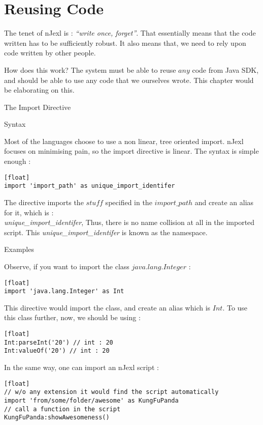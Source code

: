 \chapter{Reusing Code}\label{code-reuse}

{\LARGE T}he tenet of nJexl is : \emph{``write once, forget''}.
That essentially means that the code written has to be sufficiently robust.
It also means that, we need to rely upon code written by other people.

How does this work? The system must be able to reuse $any$ code 
from Java SDK, and should be able to use any code that we ourselves wrote.
This chapter would be elaborating on this.

\begin{section}{The Import Directive}

\begin{subsection}{Syntax}

Most of the languages choose to use a non linear, tree oriented import.
nJexl focuses on minimising pain, so the import directive is linear.
The syntax is simple enough :
\begin{lstlisting}[style=JexlStyle][float]
import 'import_path' as unique_import_identifer
\end{lstlisting}

The directive imports the $stuff$ specified in the $import\_path$ and create 
an alias for it, which is : \\ \emph{unique\_import\_identifer},
Thus, there is no name collision at all in the imported script.
This \emph{unique\_import\_identifer} is known as the namespace.

\end{subsection}

 
\begin{subsection}{Examples}

Observe, if you want to import the class $java.lang.Integer$ :

\begin{lstlisting}[style=JexlStyle][float]
import 'java.lang.Integer' as Int
\end{lstlisting}

This directive would import the class, and create an alias which is $Int$.
To use this class further, now, we should be using :

\begin{lstlisting}[style=JexlStyle][float]
Int:parseInt('20') // int : 20
Int:valueOf('20') // int : 20 
\end{lstlisting}

In the same way, one can import an nJexl script :

\begin{lstlisting}[style=JexlStyle][float]
// w/o any extension it would find the script automatically 
import 'from/some/folder/awesome' as KungFuPanda
// call a function in the script 
KungFuPanda:showAwesomeness()
\end{lstlisting}

\end{subsection}
 
\end{section}

